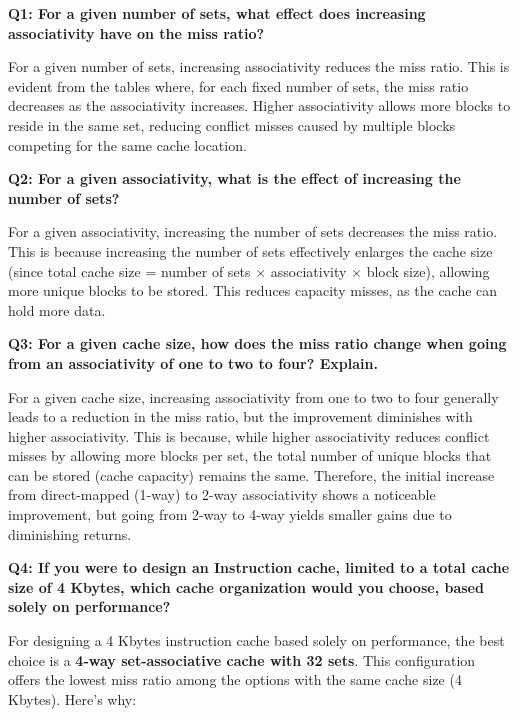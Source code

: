 \documentclass{article}
\begin{document}
\textbf{Q1: For a given number of sets, what effect does increasing associativity have on the miss ratio?}

For a given number of sets, increasing associativity reduces the miss ratio. This is evident from the tables where, for each fixed number of sets, the miss ratio decreases as the associativity increases. Higher associativity allows more blocks to reside in the same set, reducing conflict misses caused by multiple blocks competing for the same cache location.

\textbf{Q2: For a given associativity, what is the effect of increasing the number of sets?}

For a given associativity, increasing the number of sets decreases the miss ratio. This is because increasing the number of sets effectively enlarges the cache size (since total cache size = number of sets $\times$ associativity $\times$ block size), allowing more unique blocks to be stored. This reduces capacity misses, as the cache can hold more data.

\textbf{Q3: For a given cache size, how does the miss ratio change when going from an associativity of one to two to four? Explain.}

For a given cache size, increasing associativity from one to two to four generally leads to a reduction in the miss ratio, but the improvement diminishes with higher associativity. This is because, while higher associativity reduces conflict misses by allowing more blocks per set, the total number of unique blocks that can be stored (cache capacity) remains the same. Therefore, the initial increase from direct-mapped (1-way) to 2-way associativity shows a noticeable improvement, but going from 2-way to 4-way yields smaller gains due to diminishing returns.

\textbf{Q4: If you were to design an Instruction cache, limited to a total cache size of 4 Kbytes, which cache organization would you choose, based solely on performance?}

For designing a 4 Kbytes instruction cache based solely on performance, the best choice is a \textbf{4-way set-associative cache with 32 sets}. This configuration offers the lowest miss ratio among the options with the same cache size (4 Kbytes). Here’s why:
\end{document}
